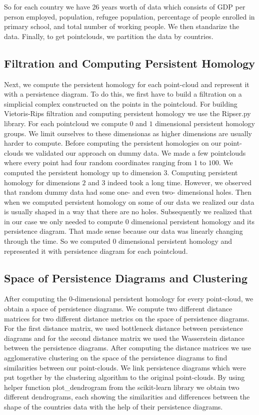 \documentclass[12pt]{article}
\begin{document}
So for each country we have 26 years worth of data which consists of GDP per person employed, population, refugee population, percentage of people enrolled in primary school, and total number of working people. We then standarize the data. Finally, to get pointclouds, we partition the data by countries. 

\subsection{Filtration and Computing Persistent Homology}
Next, we compute the persistent homology \cite{virk2022introduction} for each point-cloud and represent it with a persistence diagram. To do this, we first have to build a filtration on a simplicial complex constructed on the points in the pointcloud. For building Vietoris-Rips filtration and computing persistent homology we use the Ripser.py library. For each pointcloud we compute $0$ and $1$ dimensional persistent homology groups. We limit ourselves to these dimensionas as higher dimensions are usually harder to compute. Before computing the persistent homologies on our point-clouds we validated our approach on dummy data. We made a few pointclouds where every point had four random coordinates ranging from $1$ to $100$. We computed the persistent homology up to dimension $3$. Computing persistent homology for dimensions $2$ and $3$ indeed took a long time. However, we observed that random dummy data had some one- and even two- dimensional holes. Then when we computed persistent homology on some of our data we realized our data is usually shaped in a way that there are no holes. Subsequently we realized that in our case we only needed to compute $0$ dimensional persistent homology and its persistence diagram. That made sense because our data was linearly changing through the time. So we computed 0 dimensional persistent homology and  represented it with persistence diagram for each pointcloud. 

\subsection{Space of Persistence Diagrams and Clustering}
After computing the $0$-dimensional persistent homology for every point-cloud, we obtain a space of persistence diagrams. We compute two different distance matrices for two different distance metrics on the space of persistence diagrams. For the first distance matrix, we used bottleneck distance between persistence diagrams and for the second distance matrix we used the Wasserstein distance between the persistence diagrams. After computing the distance matrices we use agglomerative clustering on the space of the persistence diagrams to find similarities between our point-clouds. We link persistence diagrams which were put together by the clustering algorithm to the original point-clouds. By using helper function plot\_dendrogram from the scikit-learn library we obtain two different dendrograms, each showing the similarities and differences between the shape of the countries data with the help of their persistence diagrams.
\end{document}

